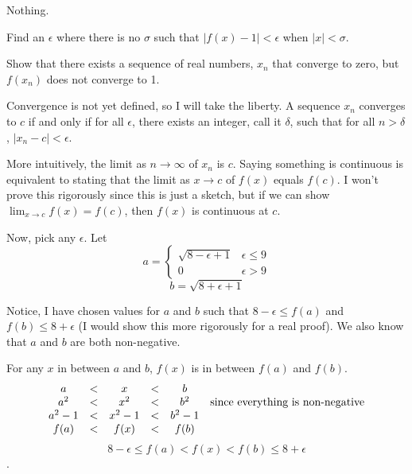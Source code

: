 \item {
Nothing.
}

\item {
Find an $ \epsilon $ where there is no $ \sigma $ such that $ |f(x) - 1| < \epsilon $ when $ |x| < \sigma $.
}

\item {
Show that there exists a sequence of real numbers, $ x_n $ that converge to zero, but $ f(x_n) $ does not converge to 1.
}

\item {
Convergence is not yet defined, so I will take the liberty. A sequence $x_n$ converges to $c$ if and only if for all $\epsilon$, there exists an integer, call it $\delta$, such that for all $n > \delta$, $| x_n - c| < \epsilon$.

More intuitively, the limit as $n \to \infty$ of $x_n$ is $c$. Saying something is continuous is equivalent to stating that the limit as $x \to c$ of $ f(x)$ equals $f(c)$. I won't prove this rigorously since this is just a sketch, but if we can show $\lim_{x \to c} f(x) = f(c)$, then $f(x)$ is continuous at $c$.

Now, pick any $\epsilon$. Let
$$a = \left\{ \begin{array}{ll}
\sqrt{8 - \epsilon + 1} & \epsilon \leq 9 \\
0 & \epsilon > 9
\end{array}\right.
$$
$$b = \sqrt{8 + \epsilon + 1}$$

Notice, I have chosen values for $a$ and $b$ such that $8 - \epsilon \leq f(a) $ and $f(b) \leq 8 + \epsilon$ (I would show this more rigorously for a real proof). We also know that $a$ and $b$ are both non-negative.


For any $x$ in between $a$ and $b$, $f(x)$ is in between $f(a)$ and $f(b)$.
\[\begin{array}{ccccc c}
a &<& x &<& b & \\
a^2 &<& x^2 &<& b^2 & \textrm{since everything is non-negative} \\
a^2  - 1 &<& x^2  - 1 &<& b^2 - 1 &  \\
f(a) &<& f(x) &<& f(b)&  \\
\end{array}\]
$$8 - \epsilon \leq f(a) < f(x) < f(b) \leq 8 + \epsilon$$. 

}
